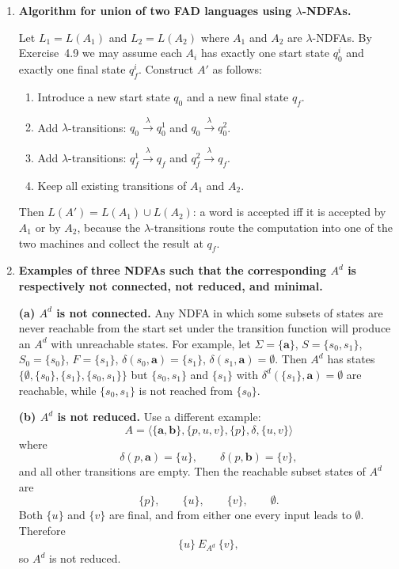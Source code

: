 \begin{enumerate}[{4.}1.]
\item \textbf{Algorithm for union of two FAD languages using $\lambda$-NDFAs.}

Let $L_1=L(A_1)$ and $L_2=L(A_2)$ where $A_1$ and $A_2$ are $\lambda$-NDFAs.
By Exercise~4.9 we may assume each $A_i$ has exactly one start state $q^i_0$ and
exactly one final state $q^i_f$.  Construct $A'$ as follows:
\begin{enumerate}[(1)]
  \item Introduce a new start state $q_0$ and a new final state $q_f$.
  \item Add $\lambda$-transitions: $q_0\xrightarrow{\lambda}q^1_0$ and
        $q_0\xrightarrow{\lambda}q^2_0$.
  \item Add $\lambda$-transitions: $q^1_f\xrightarrow{\lambda}q_f$ and
        $q^2_f\xrightarrow{\lambda}q_f$.
  \item Keep all existing transitions of $A_1$ and $A_2$.
\end{enumerate}
Then $L(A')=L(A_1)\cup L(A_2)$: a word is accepted iff it is accepted by $A_1$
or by $A_2$, because the $\lambda$-transitions route the computation into one
of the two machines and collect the result at $q_f$.

\item \textbf{Examples of three NDFAs such that the corresponding $A^d$ is
respectively not connected, not reduced, and minimal.}

\textbf{(a) $A^d$ is not connected.}  Any NDFA in which some subsets of states
are never reachable from the start set under the transition function will
produce an $A^d$ with unreachable states.  For example, let
$\Sigma=\{\pmb{a}\}$, $S=\{s_0,s_1\}$, $S_0=\{s_0\}$, $F=\{s_1\}$,
$\delta(s_0,\pmb{a})=\{s_1\}$, $\delta(s_1,\pmb{a})=\emptyset$.
Then $A^d$ has states $\{\emptyset,\{s_0\},\{s_1\},\{s_0,s_1\}\}$ but
$\{s_0,s_1\}$ and $\{s_1\}$ with $\delta^d(\{s_1\},\pmb{a})=\emptyset$ are
reachable, while $\{s_0,s_1\}$ is not reached from $\{s_0\}$.

\textbf{(b) $A^d$ is not reduced.}  Use a different example:
\[
A=\langle\{\pmb{a},\pmb{b}\},\{p,u,v\},\{p\},\delta,\{u,v\}\rangle
\]
where
\[
\delta(p,\pmb{a})=\{u\},\qquad \delta(p,\pmb{b})=\{v\},
\]
and all other transitions are empty.  Then the reachable subset states of $A^d$
are
\[
\{p\},\qquad \{u\},\qquad \{v\},\qquad \emptyset.
\]
Both $\{u\}$ and $\{v\}$ are final, and from either one every input leads to
$\emptyset$. Therefore
\[
\{u\}\ E_{A^d}\ \{v\},
\]
so $A^d$ is not reduced.


\end{enumerate}
